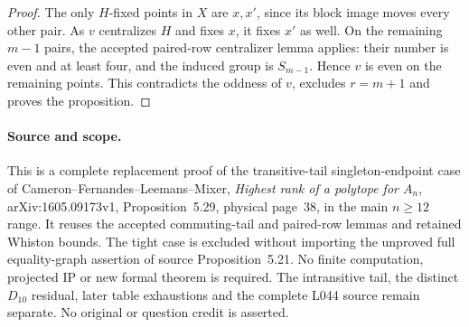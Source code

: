 \documentclass[11pt,a4paper]{article}
\begin{document}
\begin{proof}
The only $H$-fixed points in $X$ are $x,x'$, since its block
image moves every other pair. As $v$ centralizes $H$ and fixes
$x$, it fixes $x'$ as well. On the remaining $m-1$ pairs,
the accepted paired-row centralizer lemma applies: their
number is even and at least four, and the induced group is
$S_{m-1}$. Hence $v$ is even on the remaining points.
This contradicts the oddness of $v$, excludes $r=m+1$ and
proves the proposition.
\end{proof}

\paragraph{Source and scope.}
This is a complete replacement proof of the transitive-tail
singleton-endpoint case of Cameron--Fernandes--Leemans--Mixer,
\emph{Highest rank of a polytope for $A_n$},
arXiv:1605.09173v1, Proposition~5.29, physical page~38, in the
main $n\geq12$ range. It reuses the accepted commuting-tail
and paired-row lemmas and retained Whiston bounds. The tight
case is excluded without importing the unproved full
equality-graph assertion of source Proposition~5.21.
No finite computation, projected IP or new formal theorem
is required. The intransitive tail, the distinct $D_{10}$
residual, later table exhaustions and the complete L044
source remain separate. No original or question credit is
asserted.
\end{document}
